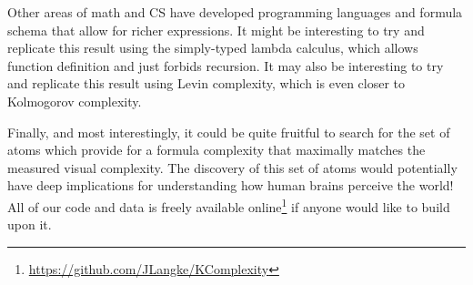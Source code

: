 \documentclass[11pt]{article}
\begin{document}
Other areas of math and CS have developed programming languages and formula
schema that allow for richer expressions. It might be interesting to try and
replicate this result using the simply-typed lambda calculus, which allows
function definition and just forbids recursion.  It may also be interesting to
try and replicate this result using Levin complexity, which is even closer to
Kolmogorov complexity.

Finally, and most interestingly, it could be quite fruitful to search for the
set of atoms which provide for a formula complexity that maximally matches the
measured visual complexity.  The discovery of this set of atoms would
potentially have deep implications for understanding how human brains perceive
the world!  All of our code and data is freely available
online\footnote{\url{https://github.com/JLangke/KComplexity}} if anyone would
like to build upon it.

 
\end{document}
